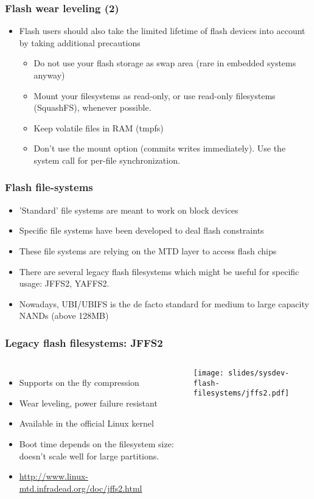 \begin{frame}
  \frametitle{Flash wear leveling (2)}
  \begin{itemize}
  \item Flash users should also take the limited lifetime of flash
    devices into account by taking additional precautions
    \begin{itemize}
    \item Do not use your flash storage as swap area (rare in embedded
      systems anyway)
    \item Mount your filesystems as read-only, or use read-only
      filesystems (SquashFS), whenever possible.
    \item Keep volatile files in RAM (tmpfs)
    \item Don't use the  mount option (commits writes
      immediately). Use the  system call for per-file
      synchronization.
    \end{itemize}
  \end{itemize}
\end{frame}

\begin{frame}
  \frametitle{Flash file-systems}
  \begin{itemize}
  \item 'Standard' file systems are meant to work on block devices
  \item Specific file systems have been developed to deal flash
    constraints
  \item These file systems are relying on the MTD layer to access
    flash chips
  \item There are several legacy flash filesystems which might be
    useful for specific usage: JFFS2, YAFFS2.
  \item Nowadays, UBI/UBIFS is the de facto standard for medium to
    large capacity NANDs (above 128MB)
  \end{itemize}
\end{frame}

\begin{frame}
  \frametitle{Legacy flash filesystems: JFFS2}
  \begin{columns}
    \begin{itemize}
    \item Supports on the fly compression
    \item Wear leveling, power failure resistant
    \item Available in the official Linux kernel
    \item Boot time depends on the filesystem size: doesn't scale well
      for large partitions.
    \item \url{http://www.linux-mtd.infradead.org/doc/jffs2.html}
    \end{itemize}
    \texttt{[image: slides/sysdev-flash-filesystems/jffs2.pdf]}
  \end{columns}
\end{frame}


